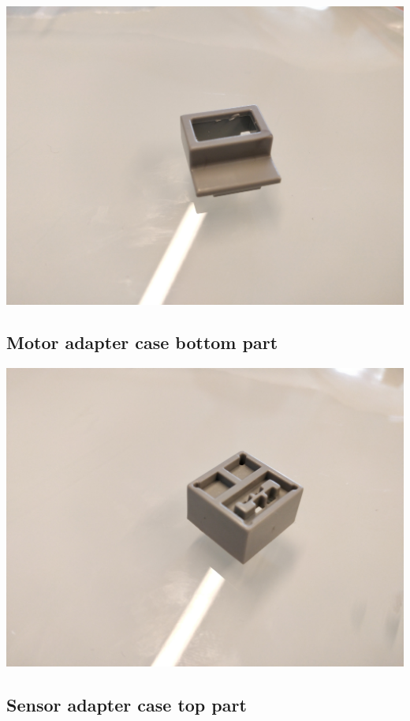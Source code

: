 \documentclass[a4paper,12pt]{article}
\begin{document}
\includegraphics[width=13.5cm]{motor-plastic-top.jpg}

\subsection{Motor adapter case bottom part}

\includegraphics[width=13.5cm]{motor-plastic-bottom.jpg}

\subsection{Sensor adapter case top part}
\end{document}
